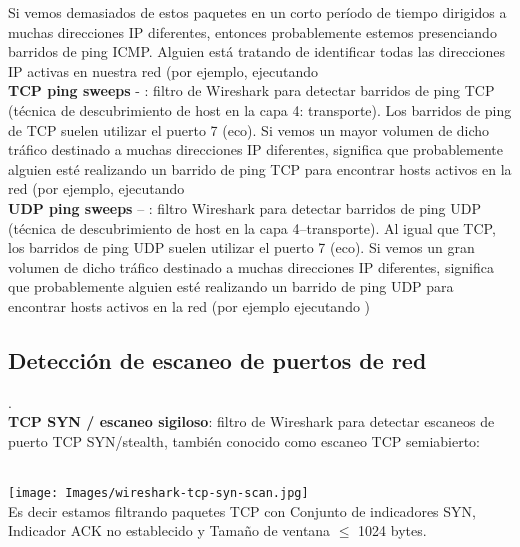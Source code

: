 Si vemos demasiados de estos paquetes en un corto período de tiempo dirigidos a muchas direcciones IP diferentes, entonces probablemente estemos presenciando barridos de ping ICMP. Alguien está tratando de identificar todas las direcciones IP activas en nuestra red (por ejemplo, ejecutando  \\



 \textbf{TCP ping sweeps}	- : filtro de Wireshark para detectar barridos de ping TCP (técnica de descubrimiento de host en la capa 4: transporte). 	Los barridos de ping de TCP suelen utilizar el puerto 7 (eco). Si vemos un mayor volumen de dicho tráfico destinado a muchas direcciones IP diferentes, significa que probablemente alguien esté realizando un barrido de ping TCP para encontrar hosts activos en la red (por ejemplo, ejecutando \\



 
 \textbf{UDP ping sweeps} --	:  filtro Wireshark para detectar barridos de ping UDP (técnica de descubrimiento de host en la capa 4--transporte). Al igual que TCP, los barridos de ping UDP suelen utilizar el puerto 7 (eco). Si vemos un gran volumen de dicho tráfico destinado a muchas direcciones IP diferentes, significa que probablemente alguien esté realizando un barrido de ping UDP para encontrar hosts activos en la red (por ejemplo ejecutando )




\subsection{Detección de escaneo de puertos de red}
.\\

\textbf{TCP SYN / escaneo sigiloso}: filtro de Wireshark para detectar escaneos de puerto TCP SYN/stealth, también conocido como escaneo TCP semiabierto:

\\
\texttt{[image: Images/wireshark-tcp-syn-scan.jpg]}\\
Es decir estamos filtrando paquetes TCP con Conjunto de indicadores SYN, Indicador ACK no establecido y Tamaño de ventana $\leq$ 1024 bytes. 

